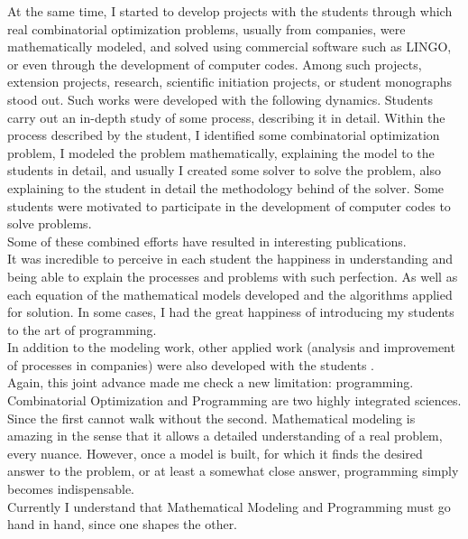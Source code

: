 \documentclass{book}
\begin{document}
At the same time, I started to develop projects with the students through which real combinatorial optimization problems, usually from companies, were mathematically modeled, and solved using commercial software such as LINGO, or even through the development of computer codes. Among such projects, extension projects, research, scientific initiation projects, or student monographs stood out. Such works were developed with the following dynamics. Students carry out an in-depth study of some process, describing it in detail. Within the process described by the student, I identified some combinatorial optimization problem, I modeled the problem mathematically, explaining the model to the students in detail, and usually I created some solver to solve the problem, also explaining to the student in detail the methodology behind of the solver. Some students were motivated to participate in the development of computer codes to solve problems. \\

Some of these combined efforts have resulted in interesting publications. \\

It was incredible to perceive in each student the happiness in understanding and being able to explain the processes and problems with such perfection. As well as each equation of the mathematical models developed and the algorithms applied for solution. In some cases, I had the great happiness of introducing my students to the art of programming. \\

In addition to the modeling work, other applied work (analysis and improvement of processes in companies) were also developed with the students \cite{AraujoEtAl2020, FragaAndSilva2015}. \\

Again, this joint advance made me check a new limitation: programming. Combinatorial Optimization and Programming are two highly integrated sciences. Since the first cannot walk without the second. Mathematical modeling is amazing in the sense that it allows a detailed understanding of a real problem, every nuance. However, once a model is built, for which it finds the desired answer to the problem, or at least a somewhat close answer, programming simply becomes indispensable. \\

Currently I understand that Mathematical Modeling and Programming must go hand in hand, since one shapes the other. \\
\end{document}
